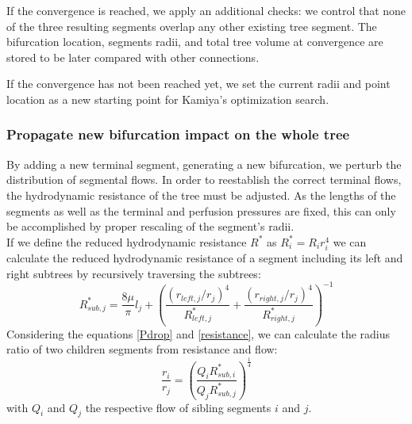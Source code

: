 \documentclass[a4paper, 11pt]{article} %
\begin{document}
 
If the convergence is reached, we apply an additional checks: we control that none of the three resulting segments overlap any other existing tree segment.
The bifurcation location, segments radii, and total tree volume at convergence are stored to be later compared with other connections.

If the convergence has not been reached yet, we set the current radii and point location as a new starting point for Kamiya's optimization search.



%
%

\subsubsection{Propagate new bifurcation impact on the whole tree}
\label{propagate}
By adding a new terminal segment, generating a new bifurcation, we perturb the distribution of segmental flows. In order to reestablish the correct terminal flows, the hydrodynamic resistance of the tree must be adjusted. As the lengths of the segments as well as the terminal and perfusion pressures are fixed, this can only be accomplished by proper rescaling of the segment's radii.\\

If we define the reduced hydrodynamic resistance $R^*$ as $R^*_i = R_i r_i^4$ we can calculate the reduced hydrodynamic resistance of a segment including its left and right subtrees by recursively traversing the subtrees:
\begin{equation} \label{red resistance}
R^*_{sub,j} = \frac{8\mu}{\pi}l_j + \left( \frac{(r_{left,j}/r_j)^4}{R_{left,j}^*} + \frac{(r_{right,j}/r_j)^4}{R_{right,j}^*}\right)^{-1}
\end{equation}
Considering the equations \eqref{Pdrop} and \eqref{resistance}, we can calculate the radius ratio of two children segments from resistance and flow:
\begin{equation} \label{children ratio}
\frac{r_i}{r_j} = \left(\frac{Q_iR_{sub,i}^*}{Q_jR_{sub,j}^*}\right)^\frac{1}{4}
\end{equation}
with $Q_i$ and $Q_j$ the respective flow of sibling segments $i$ and $j$.
\end{document}
